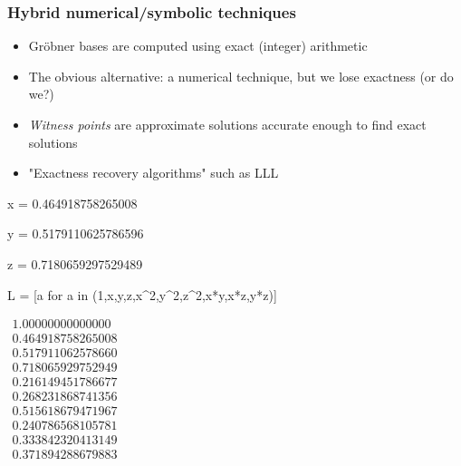 \documentclass{beamer}
\begin{document}
\begin{frame}
\frametitle{Hybrid numerical/symbolic techniques}
\begin{itemize}
\item Gr\"obner bases are computed using exact (integer) arithmetic
\item The obvious alternative: a numerical technique, but we lose exactness (or do we?)
\item {\it Witness points} are approximate solutions accurate enough to find exact solutions
\item "Exactness recovery algorithms" such as LLL
\end{itemize}

\end{frame}

\begin{frame}
\begin{semiverbatim}
\small
x = 0.464918758265008

y = 0.5179110625786596

z = 0.7180659297529489



L = [a for a in (1,x,y,z,x\^{}2,y\^{}2,z\^{}2,x*y,x*z,y*z)]


$\begin{array}{r}
1.00000000000000 \\
0.464918758265008 \\
0.517911062578660 \\
0.718065929752949 \\
0.216149451786677 \\
0.268231868741356 \\
0.515618679471967 \\
0.240786568105781 \\
0.333842320413149 \\
0.371894288679883
\end{array}
$

\end{semiverbatim}
\end{frame}
\end{document}
